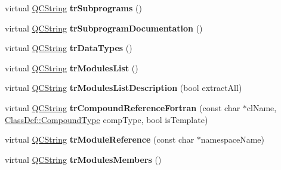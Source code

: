 \begin{DoxyCompactItemize}
\item 
\hypertarget{class_translator_adapter__1__5__4_a8d4e1de8fb5c2af1fd073c682556f999}{virtual \hyperlink{class_q_c_string}{Q\-C\-String} {\bfseries tr\-Subprograms} ()}\label{class_translator_adapter__1__5__4_a8d4e1de8fb5c2af1fd073c682556f999}

\item 
\hypertarget{class_translator_adapter__1__5__4_add6df0842eb6016d108814567d677055}{virtual \hyperlink{class_q_c_string}{Q\-C\-String} {\bfseries tr\-Subprogram\-Documentation} ()}\label{class_translator_adapter__1__5__4_add6df0842eb6016d108814567d677055}

\item 
\hypertarget{class_translator_adapter__1__5__4_a77941890cf3f7cd1b67bec4cea91439b}{virtual \hyperlink{class_q_c_string}{Q\-C\-String} {\bfseries tr\-Data\-Types} ()}\label{class_translator_adapter__1__5__4_a77941890cf3f7cd1b67bec4cea91439b}

\item 
\hypertarget{class_translator_adapter__1__5__4_a411e2c242c2707aed706b2b0572292db}{virtual \hyperlink{class_q_c_string}{Q\-C\-String} {\bfseries tr\-Modules\-List} ()}\label{class_translator_adapter__1__5__4_a411e2c242c2707aed706b2b0572292db}

\item 
\hypertarget{class_translator_adapter__1__5__4_a4f1ad06ac7478b9058d7f388a2b67566}{virtual \hyperlink{class_q_c_string}{Q\-C\-String} {\bfseries tr\-Modules\-List\-Description} (bool extract\-All)}\label{class_translator_adapter__1__5__4_a4f1ad06ac7478b9058d7f388a2b67566}

\item 
\hypertarget{class_translator_adapter__1__5__4_a79d39414275f1cacb484f78806a65869}{virtual \hyperlink{class_q_c_string}{Q\-C\-String} {\bfseries tr\-Compound\-Reference\-Fortran} (const char $\ast$cl\-Name, \hyperlink{class_class_def_a768a6f0a6fd7e9087ff7971abbcc3f36}{Class\-Def\-::\-Compound\-Type} comp\-Type, bool is\-Template)}\label{class_translator_adapter__1__5__4_a79d39414275f1cacb484f78806a65869}

\item 
\hypertarget{class_translator_adapter__1__5__4_a5b0385db8ce8e7c8251e31867c6fa8d5}{virtual \hyperlink{class_q_c_string}{Q\-C\-String} {\bfseries tr\-Module\-Reference} (const char $\ast$namespace\-Name)}\label{class_translator_adapter__1__5__4_a5b0385db8ce8e7c8251e31867c6fa8d5}

\item 
\hypertarget{class_translator_adapter__1__5__4_a75279d9914e0cc54ee5f4b15ddaa234c}{virtual \hyperlink{class_q_c_string}{Q\-C\-String} {\bfseries tr\-Modules\-Members} ()}\label{class_translator_adapter__1__5__4_a75279d9914e0cc54ee5f4b15ddaa234c}


\end{DoxyCompactItemize}
